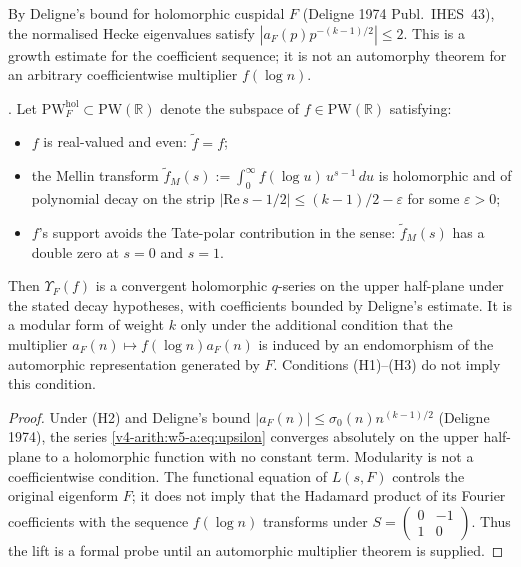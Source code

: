 By Deligne's bound for holomorphic cuspidal \(F\) (Deligne 1974
Publ.~IHES~43), the normalised Hecke eigenvalues satisfy
\(|a_{F}(p)p^{-(k-1)/2}|\le 2\). This is a growth estimate for the
coefficient sequence; it is not an automorphy theorem for an arbitrary
coefficientwise multiplier \(f(\log n)\).

\begin{lemma}
\label{v4-arith:w5-a:lem:upsilon-cuspidal}
\ClaimStatusProvedHere. Let
\(\mathrm{PW}^{\mathrm{hol}}_{F}\subset\mathrm{PW}(\mathbb{R})\) denote
the subspace of \(f\in\mathrm{PW}(\mathbb{R})\) satisfying:
\begin{itemize}
\item[(H1)] \(f\) is real-valued and even: \(\widetilde{f}=f\);
\item[(H2)] the Mellin transform
\(\widetilde{f}_{M}(s):=\int_{0}^{\infty}f(\log u)\,u^{s-1}\,du\) is
holomorphic and of polynomial decay on the strip
\(|\mathrm{Re}\,s-1/2|\leq(k-1)/2-\varepsilon\) for some \(\varepsilon>0\);
\item[(H3)] \(f\)'s support avoids the Tate-polar contribution in the
sense: \(\widetilde{f}_{M}(s)\) has a double zero at \(s=0\) and \(s=1\).
\end{itemize}
Then \(\Upsilon_F(f)\) is a convergent holomorphic \(q\)-series on the
upper half-plane under the stated decay hypotheses, with coefficients
bounded by Deligne's estimate. It is a modular form of weight \(k\) only
under the additional condition that the multiplier
\(a_F(n)\mapsto f(\log n)a_F(n)\) is induced by an endomorphism of the
automorphic representation generated by \(F\). Conditions (H1)--(H3) do
not imply this condition.
\end{lemma}

\begin{proof}
Under (H2) and Deligne's bound \(|a_{F}(n)|\leq\sigma_{0}(n)n^{(k-1)/2}\)
(Deligne 1974), the series
\eqref{v4-arith:w5-a:eq:upsilon} converges absolutely on the upper
half-plane to a holomorphic function with no constant term. Modularity
is not a coefficientwise condition. The functional equation of \(L(s,F)\)
controls the original eigenform \(F\); it does not imply that the
Hadamard product of its Fourier coefficients with the sequence
\(f(\log n)\) transforms under \(S=\begin{pmatrix}0&-1\\1&0\end{pmatrix}\).
Thus the lift is a formal probe until an automorphic multiplier theorem
is supplied.
\end{proof}

